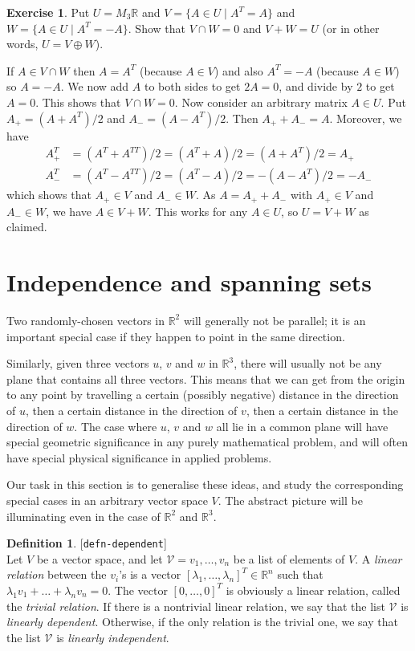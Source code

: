 \documentclass{amsart}
\newcommand{\lbl}[1]{\label{#1}\textup{[\texttt{#1}]}\ \\}
\newcommand{\lbl}{\label}
\newcommand{\R}         {{\mathbb{R}}}
\newcommand{\lm}        {\lambda}
\newcommand{\st}        {\;|\;}
\newcommand{\op}        {\oplus}
\newcommand{\CV}        {{\mathcal{V}}}
\renewcommand{\:}       {\colon}
\theoremstyle{definition}
\newtheorem{definition}[theorem]{Definition}
\newtheorem{exercise}{Exercise}[section]
\renewenvironment{solution}{\SolutionAtEnd}{\endSolutionAtEnd}
\begin{document}
\begin{exercise}
 Put $U=M_3\R$ and $V=\{A\in U\st A^T=A\}$ and
 $W=\{A\in U\st A^T=-A\}$.  Show that $V\cap W=0$ and
 $V+W=U$ (or in other words, $U=V\op W$). 
\end{exercise}
\begin{solution}
 If $A\in V\cap W$ then $A=A^T$ (because $A\in V$) and also
 $A^T=-A$ (because $A\in W$) so $A=-A$.  We now add $A$ to
 both sides to get $2A=0$, and divide by $2$ to get $A=0$. 
 This shows that $V\cap W=0$.  Now consider an arbitrary
 matrix $A\in U$.  Put $A_+=(A+A^T)/2$ and $A_-=(A-A^T)/2$. 
 Then $A_++A_-=A$.  Moreover, we have 
 \begin{align*}
  A_+^T &=(A^T+A^{TT})/2=(A^T+A)/2=(A+A^T)/2 = A_+ \\
  A_-^T &=(A^T-A^{TT})/2=(A^T-A)/2=-(A-A^T)/2 = -A_-
 \end{align*}
 which shows that $A_+\in V$ and $A_-\in W$.  As $A=A_++A_-$
 with $A_+\in V$ and $A_-\in W$, we have $A\in V+W$.  This
 works for any $A\in U$, so $U=V+W$ as claimed. 
\end{solution}


\section{Independence and spanning sets}
\label{sec-dependence}

Two randomly-chosen vectors in $\R^2$ will generally not be
parallel; it is an important special case if they happen to
point in the same direction.

Similarly, given three vectors $u$, $v$ and $w$ in $\R^3$,
there will usually not be any plane that contains all three
vectors.  This means that we can get from the origin to any
point by travelling a certain (possibly negative) distance
in the direction of $u$, then a certain distance in the
direction of $v$, then a certain distance in the direction
of $w$.  The case where $u$, $v$ and $w$ all lie in a common
plane will have special geometric significance in any purely
mathematical problem, and will often have special physical
significance in applied problems.

Our task in this section is to generalise these ideas, and
study the corresponding special cases in an arbitrary vector
space $V$.  The abstract picture will be illuminating even
in the case of $\R^2$ and $\R^3$.

\begin{definition}\lbl{defn-dependent}
 Let $V$ be a vector space, and let $\CV=v_1,\ldots,v_n$ be
 a list of elements of $V$.  A \emph{linear relation}
 between the $v_i$'s is a vector $[\lm_1,\ldots,\lm_n]^T\in\R^n$
 such that $\lm_1v_1+\ldots+\lm_nv_n=0$.  The vector
 $[0,\ldots,0]^T$ is obviously a linear relation, called the
 \emph{trivial relation}.  If there is a nontrivial linear
 relation, we say that the list $\CV$ is \emph{linearly
  dependent}.  Otherwise, if the only relation is the
 trivial one, we say that the list $\CV$ is \emph{linearly
  independent}.
\end{definition}
\end{document}
